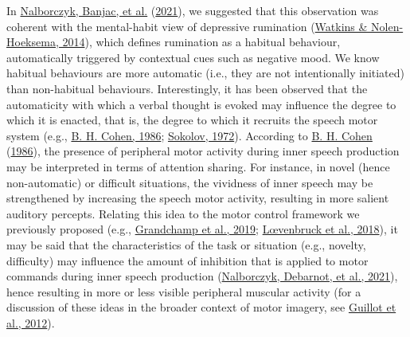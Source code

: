 \documentclass[
  english,
  man, donotrepeattitle,floatsintext]{apa6}
\begin{document}
In \protect\hyperlink{ref-nalborczyk_dissociating_2021}{Nalborczyk, Banjac, et al.} (\protect\hyperlink{ref-nalborczyk_dissociating_2021}{2021}), we suggested that this observation was coherent with the mental-habit view of depressive rumination (\protect\hyperlink{ref-watkins_habit-goal_2014}{Watkins \& Nolen-Hoeksema, 2014}), which defines rumination as a habitual behaviour, automatically triggered by contextual cues such as negative mood. We know habitual behaviours are more automatic (i.e., they are not intentionally initiated) than non-habitual behaviours. Interestingly, it has been observed that the automaticity with which a verbal thought is evoked may influence the degree to which it is enacted, that is, the degree to which it recruits the speech motor system (e.g., \protect\hyperlink{ref-cohen_motor_1986}{B. H. Cohen, 1986}; \protect\hyperlink{ref-sokolov_inner_1972}{Sokolov, 1972}). According to \protect\hyperlink{ref-cohen_motor_1986}{B. H. Cohen} (\protect\hyperlink{ref-cohen_motor_1986}{1986}), the presence of peripheral motor activity during inner speech production may be interpreted in terms of attention sharing. For instance, in novel (hence non-automatic) or difficult situations, the vividness of inner speech may be strengthened by increasing the speech motor activity, resulting in more salient auditory percepts. Relating this idea to the motor control framework we previously proposed (e.g., \protect\hyperlink{ref-grandchamp_condialint_2019}{Grandchamp et al., 2019}; \protect\hyperlink{ref-loevenbruck_cognitive_2018}{Lœvenbruck et al., 2018}), it may be said that the characteristics of the task or situation (e.g., novelty, difficulty) may influence the amount of inhibition that is applied to motor commands during inner speech production (\protect\hyperlink{ref-nalborczyk_role_2021}{Nalborczyk, Debarnot, et al., 2021}), hence resulting in more or less visible peripheral muscular activity (for a discussion of these ideas in the broader context of motor imagery, see \protect\hyperlink{ref-guillot_imagining_2012}{Guillot et al., 2012}).
\end{document}
